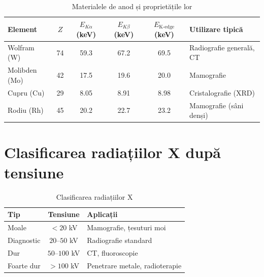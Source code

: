 \documentclass[12pt,a4paper]{article}
\begin{document}
\begin{table}[h]
\centering
\renewcommand{\arraystretch}{1.4}
\begin{tabular}{|l|c|c|c|c|l|}
\hline
\textbf{Element} & $Z$ & $E_{K\alpha}$ (keV) & $E_{K\beta}$ (keV) & $E_{\text{K-edge}}$ (keV) & \textbf{Utilizare tipică} \\
\hline
Wolfram (W)   & 74 & 59.3  & 67.2  & 69.5  & Radiografie generală, CT \\
Molibden (Mo) & 42 & 17.5  & 19.6  & 20.0  & Mamografie \\
Cupru (Cu)    & 29 &  8.05 &  8.91 &  8.98 & Cristalografie (XRD) \\
Rodiu (Rh)    & 45 & 20.2  & 22.7  & 23.2  & Mamografie (sâni denși) \\
\hline
\end{tabular}
\caption{Materialele de anod și proprietățile lor}
\end{table}


\section{Clasificarea radiațiilor X după tensiune}

\begin{table}[h]
\centering
\renewcommand{\arraystretch}{1.3}
\begin{tabular}{|l|c|l|}
\hline
\textbf{Tip} & \textbf{Tensiune} & \textbf{Aplicații} \\
\hline
Moale      & $< 20$ kV     & Mamografie, țesuturi moi \\
Diagnostic & $20$--$50$ kV & Radiografie standard \\
Dur        & $50$--$100$ kV & CT, fluoroscopie \\
Foarte dur & $> 100$ kV    & Penetrare metale, radioterapie \\
\hline
\end{tabular}
\caption{Clasificarea radiațiilor X}
\end{table}
\end{document}
